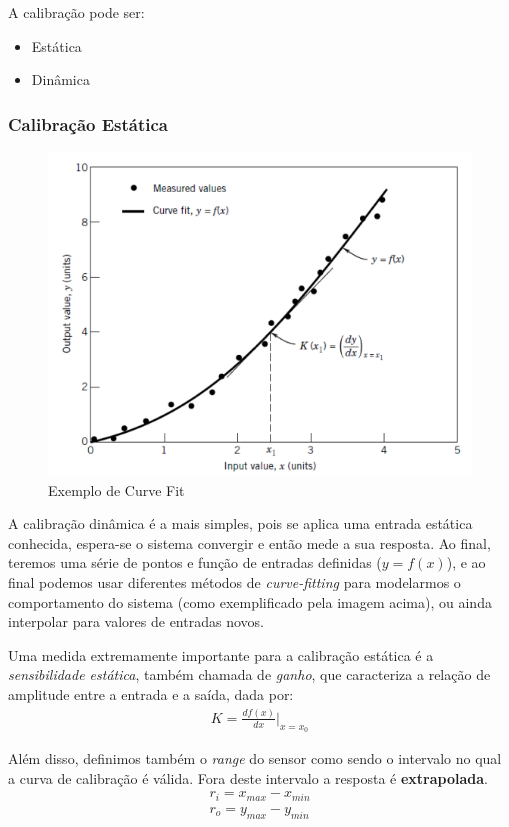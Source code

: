 \documentclass{article}
\begin{document}
            A calibração pode ser:
            \begin{itemize}
                \item Estática
                \item Dinâmica
            \end{itemize}

            \subsubsection{Calibração Estática}
                \begin{figure}[h]
                    \centering
                    \includegraphics[width=.5\textwidth]{imgs/curve_fitting_est.png}
                    \caption{Exemplo de Curve Fit}
                \end{figure}

                A calibração dinâmica é a mais simples, pois se aplica uma entrada estática conhecida, espera-se o sistema convergir e então mede a sua resposta.
                Ao final, teremos uma série de pontos e função de entradas definidas ($y = f(x)$), e ao final podemos usar diferentes métodos de \emph{curve-fitting} para modelarmos o comportamento do
                sistema (como exemplificado pela imagem acima), ou ainda interpolar para valores de entradas novos.

                Uma medida extremamente importante para a calibração estática é a \emph{sensibilidade estática}, também chamada de \emph{ganho}, que caracteriza a relação de amplitude entre a entrada
                e a saída, dada por:
                \begin{align}
                    K = \frac{df(x)}{dx} \bigg\rvert_{x=x_0} \label{eq:ganho_calib_estatica}
                \end{align}

                Além disso, definimos também o \emph{range} do sensor como sendo o intervalo no qual a curva de calibração é válida. Fora deste intervalo a resposta é \textbf{extrapolada}.
                \begin{align}
                    r_i = x_{max}-x_{min} \\
                    r_o = y_{max}-y_{min}
                \end{align}
\end{document}
